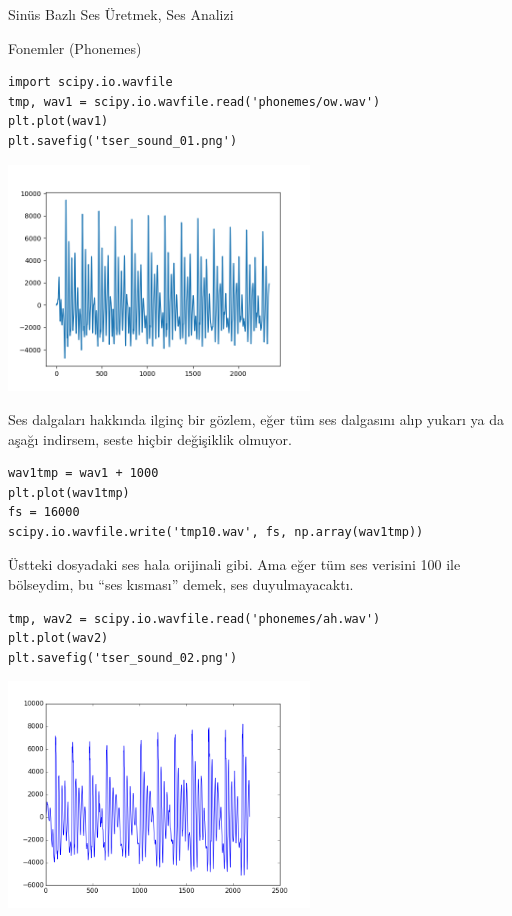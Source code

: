 \documentclass[12pt,fleqn]{article}\usepackage{../../common}
\begin{document}
Sinüs Bazlı Ses Üretmek, Ses Analizi

Fonemler (Phonemes)

\begin{verbatim}
import scipy.io.wavfile
tmp, wav1 = scipy.io.wavfile.read('phonemes/ow.wav')
plt.plot(wav1)
plt.savefig('tser_sound_01.png')
\end{verbatim}

\includegraphics[height=6cm]{tser_sound_01.png}

Ses dalgaları hakkında ilginç bir gözlem, eğer tüm ses dalgasını alıp yukarı ya
da aşağı indirsem, seste hiçbir değişiklik olmuyor. 

\begin{verbatim}
wav1tmp = wav1 + 1000
plt.plot(wav1tmp)
fs = 16000 
scipy.io.wavfile.write('tmp10.wav', fs, np.array(wav1tmp))
\end{verbatim}

Üstteki dosyadaki ses hala orijinali gibi. Ama eğer tüm ses verisini 100 ile
bölseydim, bu ``ses kısması'' demek, ses duyulmayacaktı. 

\begin{verbatim}
tmp, wav2 = scipy.io.wavfile.read('phonemes/ah.wav')
plt.plot(wav2)
plt.savefig('tser_sound_02.png')
\end{verbatim}

\includegraphics[height=6cm]{tser_sound_02.png}
\end{document}
